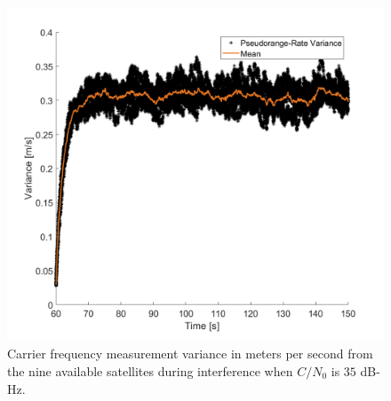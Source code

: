 \documentclass[12pt]{report}
\begin{document}
\begin{figure}[!ht]
  \centering
  \includegraphics[width=0.75\linewidth]{Figures/Results/Scenario1/Case35/carrierVariance.png}
  \caption{Carrier frequency measurement variance in meters per second from the nine available satellites during interference when \(C/N_0\) is \(35\) dB-Hz.}\label{fig:carrierVariance35}
\end{figure}
\end{document}
